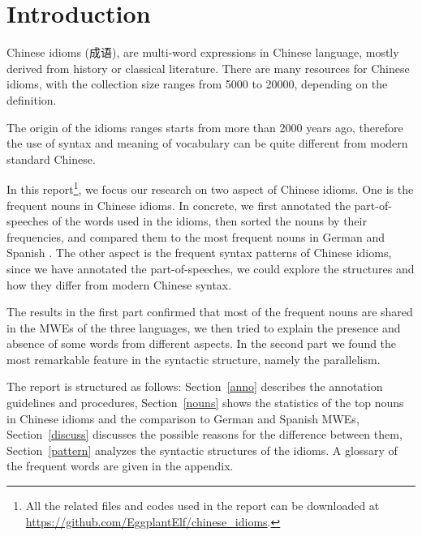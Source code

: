 \section{Introduction}
Chinese idioms (成语), are multi-word expressions in Chinese language, mostly derived from history or classical literature. There are many resources for Chinese idioms, with the collection size ranges from 5000 to 20000, depending on the definition.


The origin of the idioms ranges starts from more than 2000 years ago, therefore the use of syntax and meaning of vocabulary can be quite different from modern standard Chinese. 

In this report\footnote{All the related files and codes used in the report can be downloaded at \url{https://github.com/EggplantElf/chinese_idioms}.}, we focus our research on two aspect of Chinese idioms. 
One is the frequent nouns in Chinese idioms. In concrete, we first annotated the part-of-speeches of the words used in the idioms, then sorted the nouns by their frequencies, and compared them to the most frequent nouns in German and Spanish \citep{mahlow:2013, Duden:2008, Seco:2004}. 
The other aspect is the frequent syntax patterns of Chinese idioms, since we have annotated the part-of-speeches, we could explore the structures and how they differ from modern Chinese syntax.

The results in the first part confirmed that most of the frequent nouns are shared in the MWEs of the three languages, we then tried to explain the presence and absence of some words from different aspects.
In the second part we found the most remarkable feature in the syntactic structure, namely the parallelism. 

The report is structured as follows: Section~\ref{anno} describes the annotation guidelines and procedures, Section~\ref{nouns} shows the statistics of the top nouns in Chinese idioms and the comparison to German and Spanish MWEs, Section~\ref{discuss} discusses the possible reasons for the difference between them, Section~\ref{pattern} analyzes the syntactic structures of the idioms. A glossary of the frequent words are given in the appendix.

